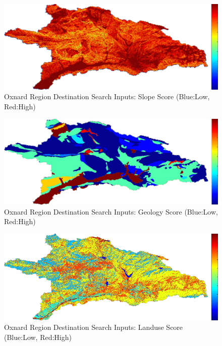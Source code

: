         \begin{figure}[!h]
            \begin{center}
            \includegraphics[width=5.5in]{figures/Oxnard_Search_Slope.png}   
            \caption{Oxnard Region Destination Search Inputs: Slope Score (Blue:Low, Red:High)}
            \label{fig:Odsinputs_slope}
            \end{center}
        \end{figure}
        
        \begin{figure}[!h]
            \begin{center}
            \includegraphics[width=5.5in]{figures/Oxnard_Search_Geology.png}   
            \caption{Oxnard Region Destination Search Inputs: Geology Score (Blue:Low, Red:High)}
            \label{fig:Odsinputs_geology}
            \end{center}
        \end{figure}
    
        \begin{figure}[!h]
            \begin{center}
            \includegraphics[width=5.5in]{figures/Oxnard_Search_Landuse.png}   
            \caption{Oxnard Region Destination Search Inputs: Landuse Score (Blue:Low, Red:High)}
            \label{fig:Odsinputs_landuse}
            \end{center}
        \end{figure}
    

